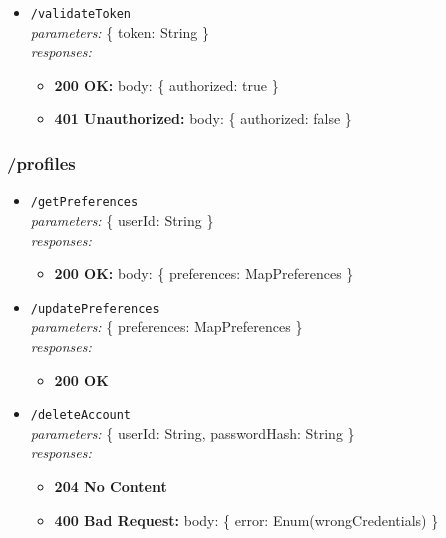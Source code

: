 \begin{itemize}
    \item \texttt{/validateToken} \\
    \textit{parameters:} \{ token: String \} \\
    \textit{responses:}
    \begin{itemize}
        \item \textbf{200 OK:} body: \{ authorized: true \}
        \item \textbf{401 Unauthorized:} body: \{ authorized: false \}
    \end{itemize}
\end{itemize}

\subsubsection*{/profiles}

\begin{itemize}
    \item \texttt{/getPreferences} \\
    \textit{parameters:} \{ userId: String \} \\
    \textit{responses:}
    \begin{itemize}
        \item \textbf{200 OK:} body: \{ preferences: MapPreferences \}
    \end{itemize}

    \item \texttt{/updatePreferences} \\
    \textit{parameters:} \{ preferences: MapPreferences \} \\
    \textit{responses:}
    \begin{itemize}
        \item \textbf{200 OK}
    \end{itemize}

    \item \texttt{/deleteAccount} \\
    \textit{parameters:} \{ userId: String, passwordHash: String \} \\
    \textit{responses:}
    \begin{itemize}
        \item \textbf{204 No Content}
        \item \textbf{400 Bad Request:} body: \{ error: Enum(wrongCredentials) \}
    \end{itemize}
\end{itemize}


